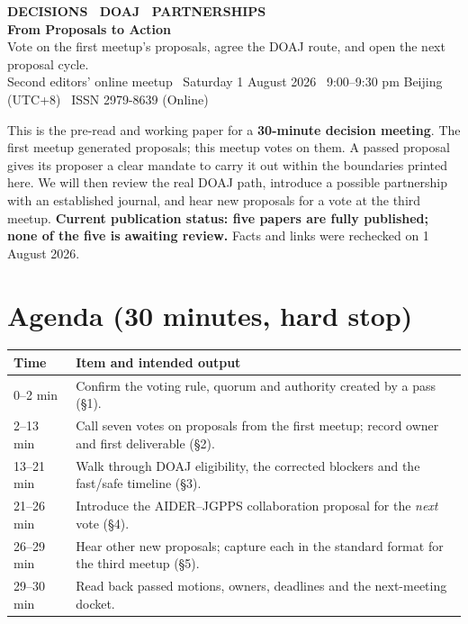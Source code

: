 \documentclass[11pt]{article}
\begin{document}
\begin{tcolorbox}[colback=darkbg, colframe=darkbg, arc=3pt, left=18pt, right=18pt, top=14pt, bottom=14pt]
  {\sffamily\footnotesize\color{accent}\bfseries DECISIONS \textbullet\ DOAJ \textbullet\ PARTNERSHIPS}\\[4pt]
  {\sffamily\LARGE\bfseries\color{white} From Proposals to Action}\\[5pt]
  {\sffamily\small\color{white!75} Vote on the first meetup's proposals, agree the DOAJ route, and open the next proposal cycle.}\\[8pt]
  {\sffamily\footnotesize\color{white!60} Second editors' online meetup \textbullet\ Saturday 1 August 2026 \textbullet\ 9:00--9:30 pm Beijing (UTC+8) \textbullet\ ISSN 2979-8639 (Online)}
\end{tcolorbox}

\vspace{4pt}
{\small\color{ink2} This is the pre-read and working paper for a \textbf{30-minute decision meeting}. The first meetup generated proposals; this meetup votes on them. A passed proposal gives its proposer a clear mandate to carry it out within the boundaries printed here. We will then review the real DOAJ path, introduce a possible partnership with an established journal, and hear new proposals for a vote at the third meetup. \textbf{Current publication status: five papers are fully published; none of the five is awaiting review.} Facts and links were rechecked on 1 August 2026.}

\section*{Agenda \textnormal{\footnotesize\color{ink3}(30 minutes, hard stop)}}
\renewcommand{\arraystretch}{1.14}
\begin{center}\small
\begin{tabular}{@{}p{1.45cm} p{12.7cm}@{}}
\toprule
\textbf{Time} & \textbf{Item and intended output} \\
\midrule
0--2 min & Confirm the voting rule, quorum and authority created by a pass (\S1). \\
2--13 min & Call seven votes on proposals from the first meetup; record owner and first deliverable (\S2). \\
13--21 min & Walk through DOAJ eligibility, the corrected blockers and the fast/safe timeline (\S3). \\
21--26 min & Introduce the AIDER--JGPPS collaboration proposal for the \emph{next} vote (\S4). \\
26--29 min & Hear other new proposals; capture each in the standard format for the third meetup (\S5). \\
29--30 min & Read back passed motions, owners, deadlines and the next-meeting docket. \\
\bottomrule
\end{tabular}
\end{center}
\end{document}
